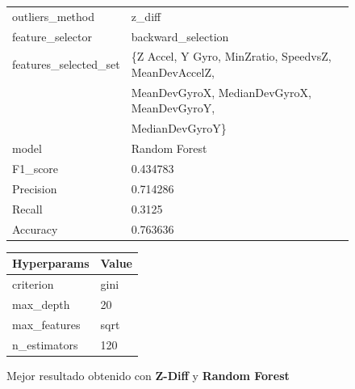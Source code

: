 \begin{appendices}
\begin{figure}[htb]
			\begin{tabular}{ll}
				\toprule
					  outliers\_method &                                             z\_diff \\
					 feature\_selector &                                 backward\_selection \\
				features\_selected\_set & \{Z Accel, Y Gyro, MinZratio, SpeedvsZ, MeanDevAccelZ, \\
                						& MeanDevGyroX, MedianDevGyroX, MeanDevGyroY,\\ 
										& MedianDevGyroY\} \\
								model &                                      Random Forest \\
							 F1\_score &                                           0.434783 \\
							Precision &                                           0.714286 \\
							   Recall &                                             0.3125 \\
							 Accuracy &                                           0.763636 \\
				\bottomrule
			\end{tabular}
			\newline
			\newline

			\begin{tabular}{ll}
				\toprule
				 Hyperparams & Value \\
				\midrule
				   criterion &  gini \\
				   max\_depth &    20 \\
				max\_features &  sqrt \\
				n\_estimators &   120 \\
				\bottomrule
			\end{tabular}
			\caption{Mejor resultado obtenido con \textbf{Z-Diff} y \textbf{Random Forest}}
			\label{table:31}

		\end{figure}


\end{appendices}
